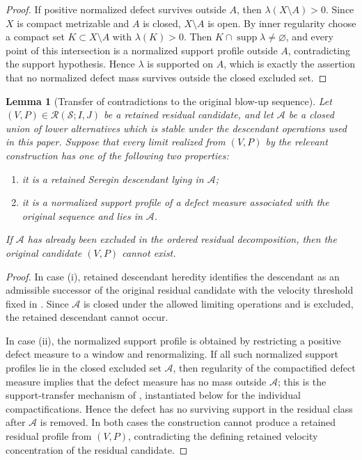 \documentclass[11pt]{amsart}
\numberwithin{equation}{section}
\theoremstyle{plain}
\newtheorem{lemma}[lemma]{Lemma}
\theoremstyle{definition}
\theoremstyle{remark}
\newcommand{\calS}{\mathcal S}
\newcommand{\calR}{\mathcal R}
\begin{document}
\begin{proof}
If positive normalized defect survives outside \(A\), then
\(\lambda(X\setminus A)>0\).  Since \(X\) is compact metrizable and \(A\) is
closed, \(X\setminus A\) is open.  By inner regularity choose a compact set
\(K\subset X\setminus A\) with \(\lambda(K)>0\).  Then
\(K\cap\operatorname{supp}\lambda\ne\varnothing\), and every point of this
intersection is a normalized support profile outside \(A\), contradicting the
support hypothesis.  Hence \(\lambda\) is supported on \(A\), which is exactly
the assertion that no normalized defect mass survives outside the closed
excluded set.
\end{proof}

\begin{lemma}[Transfer of contradictions to the original blow-up sequence]
\label{lem:ancestor-contradiction-transfer}
Let \((V,P)\in\calR(\calS;I,J)\) be a retained residual candidate, and let
\(\mathcal A\) be a closed union of lower alternatives which is stable under
the descendant operations used in this paper.  Suppose that every
limit realized from \((V,P)\) by the relevant construction
has one of the following two properties:
\begin{enumerate}[label=\textup{(\roman*)}]
   \item it is a retained Seregin descendant lying in \(\mathcal A\);
   \item it is a normalized support profile of a defect measure associated with the original sequence and lies
   in \(\mathcal A\).
\end{enumerate}
If \(\mathcal A\) has already been excluded in the ordered residual
decomposition, then the original candidate \((V,P)\) cannot exist.
\end{lemma}

\begin{proof}
In case \textup{(i)}, retained descendant heredity
 identifies the descendant as an admissible
successor of the original residual candidate with the velocity threshold fixed
in .  Since \(\mathcal A\) is closed under the
allowed limiting operations and is excluded, the retained descendant cannot
occur.

In case \textup{(ii)}, the normalized support profile is obtained by restricting a
positive defect measure to a window and renormalizing.  If all such
normalized support profiles lie in the closed excluded set \(\mathcal A\), then
regularity of the compactified defect measure implies that the defect
measure has no mass outside \(\mathcal A\); this is the support-transfer
mechanism of , instantiated below
for the individual compactifications.  Hence the defect has no surviving
support in the residual class after \(\mathcal A\) is removed.  In both cases
the construction cannot produce a retained residual profile from \((V,P)\),
contradicting the defining retained velocity concentration of the residual candidate.
\end{proof}
\end{document}
